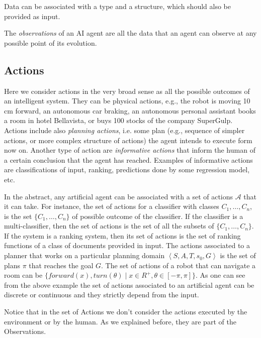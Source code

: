 Data can be associated with a type and a structure, which should
also be provided as input. 

\begin{definition}
The \emph{observations} of an AI agent are all the data that an agent
can observe at any possible point of its evolution. 
\end{definition}

\subsection{Actions}
\def\actions{\mathcal{A}} Here we consider actions in the very broad
sense as all the possible outcomes of an intelligent system. They can
be physical actions, e.g., the robot is moving 10 cm forward, an
autonomous car braking, an autonomous personal assistant books a room
in hotel Bellavista, or buys 100 stocks of the company SuperGulp.
Actions include also \emph{planning actions}, i.e.  some plan (e.g.,
sequence of simpler actions, or more complex structure of actions) the
agent intends to execute form now on. Another type of action are
\emph{informative actions} that inform the human of a certain
conclusion that the agent has reached. Examples of informative actions
are classifications of input, ranking, predictions done by some
regression model, etc.

In the abstract, any artificial agent can be associated with a set of
actions $\actions$ that it can take. For instance, the set of actions
for a classifier with classes $C_1,\dots,C_n$, is the set
$\{C_1,\dots,C_n\}$ of possible outcome of the classifier. If the
classifier is a multi-classifier, then the set of actions is the set
of all the subsets of $\{C_1,\dots,C_n\}$. If the system is a ranking
system, then its set of actions is the set of ranking functions
of a class of documents provided in input.
The actions associated to a planner that works on a particular
planning domain $\left<S,A,T,s_0,G\right>$ is the set of plans $\pi$
that reaches the goal $G$. The set of actions of a robot that can
navigate a room can be $\{forward(x),turn(\theta) \mid x \in R^+,
\theta \in [-\pi,\pi]\}$.
As one can see from the above example the set of actions associated to
an artificial agent can be discrete or continuous and they strictly
depend from the input.

Notice that in the set of Actions we don't consider the actions
executed by the environment or by the human. As we explained before,
they are part of the Observations.


